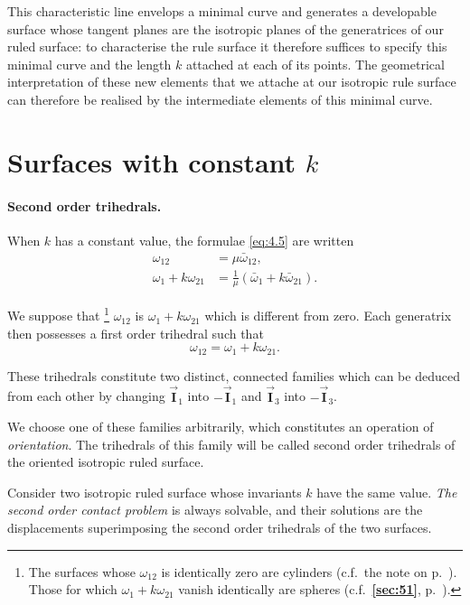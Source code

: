 \documentclass[leqno,11pt]{book}
\numberwithin{equation}{chapter}
\theoremstyle{shape1}
\theoremstyle{shapesmall}
\newcommand{\fsref}[1]{{\rm\textsection\textbf{\ref{sec:#1}}}}
\newcommand{\rvec}[1]{\vec{\mathbf{#1}}}
\newcommand{\ivec}{\rvec{I}}
\begin{document}
This characteristic line envelops a minimal curve and generates a developable surface whose tangent planes are the isotropic planes of the generatrices of our ruled surface: to characterise the rule surface it therefore suffices to specify this minimal curve and the length $k$ attached at each of its points. The geometrical interpretation of these new elements  that we attache at our isotropic rule surface can therefore be realised by the intermediate elements of this minimal curve.

\section{Surfaces with constant $k$}
\label{sec:surf-with-const}

\paragraph{Second order trihedrals.}
\label{sec:53}
When $k$ has a constant value, the formulae \eqref{eq:4.5} are written
\begin{align*}
  \omega_{12}&=\mu\bar\omega_{12},\\
  \omega_{1}+k\omega_{21}&=\frac{1}{\mu}(\bar\omega_{1}+k\bar\omega_{21}).
\end{align*}

We suppose that \footnote{The surfaces whose $\omega_{12}$ is identically zero are cylinders (c.f.~the note on p.~\pageref{sec:50}). Those for which $\omega_{1}+k\omega_{21}$ vanish identically are spheres (c.f.~\fsref{51}, p.~\pageref{sec:51}).} $\omega_{12}$ is $\omega_{1}+k\omega_{21}$ which is different from zero. Each generatrix then possesses a first order trihedral such that
\begin{equation}
  \label{eq:4.8}
  \omega_{12}=\omega_{1}+k\omega_{21}.
\end{equation}

These trihedrals constitute two distinct, connected families which can be deduced from each other by changing $\ivec_{1}$ into $-\ivec_{1}$ and $\ivec_{3}$ into $-\ivec_{3}$.

We choose one of these families arbitrarily, which constitutes an operation of \emph{orientation}. The trihedrals of this family will be called second order trihedrals of the oriented isotropic ruled surface.

Consider two isotropic ruled surface whose invariants $k$ have the same value. \emph{The second order contact problem} is always solvable, and their solutions are the displacements superimposing the second order trihedrals of the two surfaces.
\end{document}
